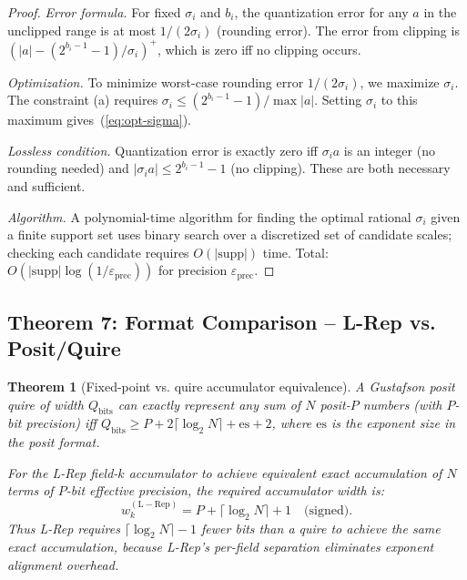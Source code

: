 \documentclass[11pt,a4paper]{article}
\theoremstyle{definition}
\theoremstyle{plain}
\newtheorem{theorem}{Theorem}[section]
\theoremstyle{remark}
\begin{document}
\begin{proof}
\textit{Error formula.}  For fixed $\sigma_i$ and $b_i$, the quantization error for any $a$ in the unclipped range is at most $1/(2\sigma_i)$ (rounding error).  The error from clipping is $(|a| - (2^{b_i-1}-1)/\sigma_i)^+$, which is zero iff no clipping occurs.

\textit{Optimization.}  To minimize worst-case rounding error $1/(2\sigma_i)$, we maximize $\sigma_i$.  The constraint (a) requires $\sigma_i \le (2^{b_i-1}-1)/\max|a|$.  Setting $\sigma_i$ to this maximum gives~(\ref{eq:opt-sigma}).

\textit{Lossless condition.}  Quantization error is exactly zero iff $\sigma_i a$ is an integer (no rounding needed) and $|\sigma_i a|\le 2^{b_i-1}-1$ (no clipping).  These are both necessary and sufficient.

\textit{Algorithm.}  A polynomial-time algorithm for finding the optimal rational $\sigma_i$ given a finite support set uses binary search over a discretized set of candidate scales; checking each candidate requires $O(|\mathrm{supp}|)$ time.  Total: $O(|\mathrm{supp}| \log(1/\varepsilon_{\mathrm{prec}}))$ for precision $\varepsilon_{\mathrm{prec}}$.
\end{proof}

\subsection{Theorem 7: Format Comparison -- L-Rep vs. Posit/Quire}
\label{sec:format}

\begin{theorem}[Fixed-point vs. quire accumulator equivalence]
\label{thm:format}
A Gustafson posit quire of width $Q_\mathrm{bits}$ can exactly represent any sum of $N$ posit-$P$ numbers (with $P$-bit precision) iff $Q_\mathrm{bits} \ge P + 2\lceil \log_2 N\rceil + \mathrm{es} + 2$, where $\mathrm{es}$ is the exponent size in the posit format.

For the L-Rep field-$k$ accumulator to achieve equivalent exact accumulation of $N$ terms of $P$-bit effective precision, the required accumulator width is:
\begin{equation}\label{eq:quire-equiv}
  w_k^{(\mathrm{L-Rep})} = P + \lceil\log_2 N\rceil + 1 \quad\text{(signed)}.
\end{equation}
Thus L-Rep requires $\lceil\log_2 N\rceil - 1$ fewer bits than a quire to achieve the same exact accumulation, because L-Rep's per-field separation eliminates exponent alignment overhead.
\end{theorem}
\end{document}
